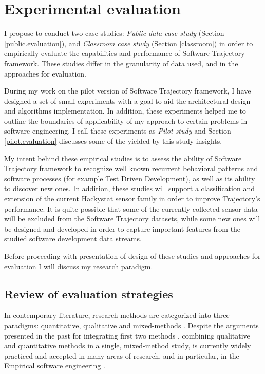 \chapter{Experimental evaluation} \label{experiments}
I propose to conduct two case studies: \textit{Public data case study} (Section \ref{public.evaluation}), and \textit{Classroom case study} (Section \ref{classroom}) in order to empirically evaluate the capabilities and performance of Software Trajectory framework. These studies differ in the granularity of data used, and in the approaches for evaluation. 

During my work on the pilot version of Software Trajectory framework, I have designed a set of small experiments with a goal to aid the architectural design and algorithms implementation. In addition, these experiments helped me to outline the boundaries of applicability of my approach to certain problems in software engineering. I call these experiments as \textit{Pilot study} and Section \ref{pilot.evaluation} discusses some of the yielded by this study insights.

My intent behind these empirical studies is to assess the ability of Software Trajectory framework to recognize well known recurrent behavioral patterns and software processes (for example Test Driven Development), as well as its ability to discover new ones. In addition, these studies will support a classification and extension of the current Hackystat sensor family in order to improve Trajectory's performance. It is quite possible that some of the currently collected sensor data will be excluded from the Software Trajectory datasets, while some new ones will be designed and developed in order to capture important features from the studied software development data streams. 

Before proceeding with presentation of design of these studies and approaches for evaluation I will discuss my research paradigm.

\section{Review of evaluation strategies}
In contemporary literature, research methods are categorized into three paradigms: quantitative, qualitative and mixed-methods  \cite{citeulike:5410262}. Despite the arguments presented in the past for integrating first two methods \cite{GubaLincoln-CompetingParadigms}, combining qualitative and quantitative methods in a single, mixed-method study, is currently widely practiced and accepted in many areas of research, and in particular, in the Empirical software engineering \cite{citeulike:5361927} \cite{citeulike:5361791}. 

